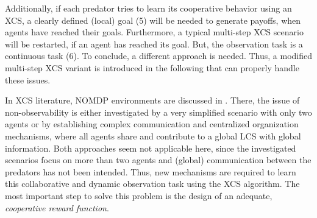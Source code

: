 Additionally, if each predator tries to learn its cooperative behavior using an XCS, a clearly defined (local) goal (5) will be needed to generate payoffs, when agents have reached their goals. Furthermore, a typical multi-step XCS scenario will be restarted, if an agent has reached its goal. But, the observation task is a continuous task (6). %
To conclude, a different approach is needed. Thus, a modified multi-step XCS variant is introduced in the following that can properly handle these issues.

In XCS literature, NOMDP environments are discussed in \cite{Miyazaki2,TTS01}. There, the issue of non-observability is either investigated by a very simplified scenario with only two agents or by establishing complex communication and centralized organization mechanisms, where all agents share and contribute to a global LCS with global information. Both approaches seem not applicable here, since the investigated scenarios focus on more than two agents and (global) communication between the predators has not been intended. Thus, new mechanisms are required to learn this %
collaborative and dynamic observation task using the XCS algorithm. The most important step to solve this problem is the design of an adequate, \emph{cooperative reward function}. %
